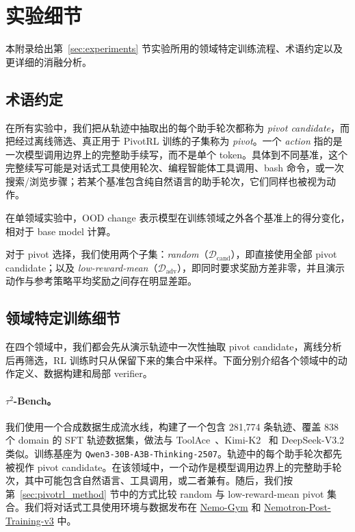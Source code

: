 \section{实验细节}
\label{app:experiment_details}

本附录给出第~\ref{sec:experiments} 节实验所用的领域特定训练流程、术语约定以及更详细的消融分析。

\subsection{术语约定}
\label{app:terminology}

在所有实验中，我们把从轨迹中抽取出的每个助手轮次都称为 \emph{pivot candidate}，而把经过离线筛选、真正用于 PivotRL 训练的子集称为 \emph{pivot}。一个 \emph{action} 指的是一次模型调用边界上的完整助手续写，而不是单个 token。具体到不同基准，这个完整续写可能是对话式工具使用轮次、编程智能体工具调用、bash 命令，或一次搜索/浏览步骤；若某个基准包含纯自然语言的助手轮次，它们同样也被视为动作。

在单领域实验中，OOD change 表示模型在训练领域之外各个基准上的得分变化，相对于 base model 计算。

对于 pivot 选择，我们使用两个子集：\emph{random}（$\mathcal{D}_{\mathrm{cand}}$），即直接使用全部 pivot candidate；以及 \emph{low-reward-mean}（$\mathcal{D}_{\mathrm{adv}}$），即同时要求奖励方差非零，并且演示动作与参考策略平均奖励之间存在明显差距。

\subsection{领域特定训练细节}
\label{app:training_details}

在四个领域中，我们都会先从演示轨迹中一次性抽取 pivot candidate，离线分析后再筛选，RL 训练时只从保留下来的集合中采样。下面分别介绍各个领域中的动作定义、数据构建和局部 verifier。

\paragraph{$\tau^2$-Bench。}
我们使用一个合成数据生成流水线，构建了一个包含 281{,}774 条轨迹、覆盖 838 个 domain 的 SFT 轨迹数据集，做法与 ToolAce~\citep{liu2025toolacewinningpointsllm}、Kimi-K2~\citep{kimiteam2025kimik2openagentic} 和 DeepSeek-V3.2~\citep{deepseekai2025deepseekv32pushingfrontieropen} 类似。训练基座为 \texttt{Qwen3-30B-A3B-Thinking-2507}。轨迹中的每个助手轮次都先被视作 pivot candidate。在该领域中，一个动作是模型调用边界上的完整助手轮次，其中可能包含自然语言、工具调用，或二者兼有。随后，我们按第~\ref{sec:pivotrl_method} 节中的方式比较 random 与 low-reward-mean pivot 集合。我们将对话式工具使用环境与数据发布在 \href{https://github.com/NVIDIA-NeMo/Gym/tree/main/resources_servers/single_step_tool_use_with_argument_comparison}{Nemo-Gym} 和 \href{https://huggingface.co/datasets/nvidia/Nemotron-RL-Agentic-Conversational-Tool-Use-Pivot-v1}{Nemotron-Post-Training-v3} 中。

